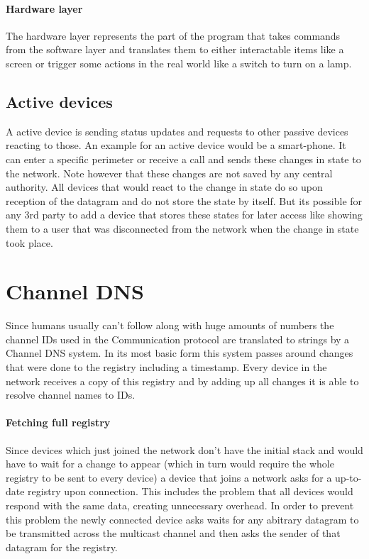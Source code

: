 \documentclass[a4paper]{article}
\begin{document}
            \paragraph{Hardware layer} The hardware layer represents the part of the program that takes commands from the
                software layer and translates them to either interactable items like a screen or trigger some actions in
                the real world like a switch to turn on a lamp.
        \subsection{Active devices}
            A active device is sending status updates and requests to other passive devices reacting to those. An
            example for an active device would be a smart-phone. It can enter a specific perimeter or receive a call and
            sends these changes in state to the network. Note however that these changes are not saved by any
            central authority. All devices that would react to the change in state do so upon reception of the datagram
            and do not store the state by itself. But its possible for any 3rd party to add a device that stores these
            states for later access like showing them to a user that was disconnected from the network when the change
            in state took place.
	\section{Channel DNS}
	    Since humans usually can't follow along with huge amounts of numbers the channel IDs used in the Communication
	    protocol are translated to strings by a Channel DNS system. In its most basic form this system passes around
	    changes that were done to the registry including a timestamp. Every device in the network receives a
	    copy of this registry and by adding up all changes it is able to resolve channel names to IDs.
	    \paragraph{Fetching full registry} Since devices which just joined the network don't have the initial stack and
	        would have to wait for a change to appear (which in turn would require the whole registry to be sent to
	        every device) a device that joins a network asks for a up-to-date registry upon connection. This
	        includes the problem that all devices would respond with the same data, creating unnecessary overhead. In
	        order to prevent this problem the newly connected device asks waits for any abitrary datagram to be
	        transmitted across the multicast channel and then asks the sender of that datagram for the registry.
\end{document}
